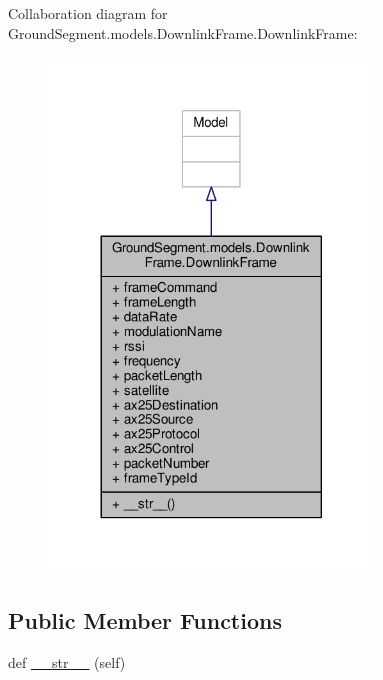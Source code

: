 Collaboration diagram for Ground\+Segment.\+models.\+Downlink\+Frame.\+Downlink\+Frame\+:\nopagebreak
\begin{figure}[H]
\begin{center}
\leavevmode
\includegraphics[width=245pt]{class_ground_segment_1_1models_1_1_downlink_frame_1_1_downlink_frame__coll__graph}
\end{center}
\end{figure}
\subsection*{Public Member Functions}
\begin{DoxyCompactItemize}
\item 
def \hyperlink{class_ground_segment_1_1models_1_1_downlink_frame_1_1_downlink_frame_a2ee34c8bf18c852a937c8a57f92acf52}{\+\_\+\+\_\+str\+\_\+\+\_\+} (self)
\end{DoxyCompactItemize}
